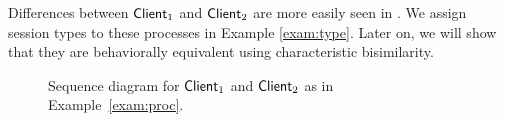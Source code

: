 \begin{example}
%
%
%

Differences between $\mathsf{Client}_1$ and $\mathsf{Client}_2$ are more easily seen in . 
We assign session types to these processes in Example \ref{exam:type}.
Later on, we will show that they are behaviorally equivalent using characteristic bisimilarity.
\begin{figure}

\caption{Sequence diagram for $\mathsf{Client}_1$ and $\mathsf{Client}_2$ as in Example~\ref{exam:proc}\label{fig:exam}.}
\end{figure}
\end{example}
